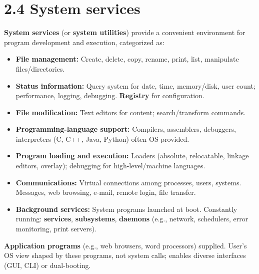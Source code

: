\section*{2.4 System services}

\textbf{System services} (or \textbf{system utilities}) provide a convenient environment for program development and execution, categorized as:
\begin{itemize}
    \item \textbf{File management:} Create, delete, copy, rename, print, list, manipulate files/directories.
    \item \textbf{Status information:} Query system for date, time, memory/disk, user count; performance, logging, debugging. \textbf{Registry} for configuration.
    \item \textbf{File modification:} Text editors for content; search/transform commands.
    \item \textbf{Programming-language support:} Compilers, assemblers, debuggers, interpreters (C, C++, Java, Python) often OS-provided.
    \item \textbf{Program loading and execution:} Loaders (absolute, relocatable, linkage editors, overlay); debugging for high-level/machine languages.
    \item \textbf{Communications:} Virtual connections among processes, users, systems. Messages, web browsing, e-mail, remote login, file transfer.
    \item \textbf{Background services:} System programs launched at boot. Constantly running: \textbf{services}, \textbf{subsystems}, \textbf{daemons} (e.g., network, schedulers, error monitoring, print servers).
\end{itemize}
\textbf{Application programs} (e.g., web browsers, word processors) supplied. User's OS view shaped by these programs, not system calls; enables diverse interfaces (GUI, CLI) or dual-booting.


